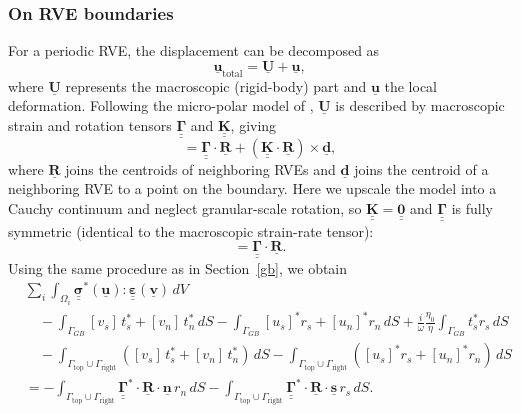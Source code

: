 \documentclass[12pt]{article}
\newcommand{\tensor}[1]{\underline{\underline{\boldsymbol{#1}}}}
\newcommand{\vect}[1]{\underline{\boldsymbol{#1}}}
\begin{document}
\subsubsection{On RVE boundaries}
For a periodic RVE, the displacement can be decomposed as
\begin{equation}
    \vect{u}_{\text{total}} = \vect{U} + \vect{u},
\end{equation}
where $\vect{U}$ represents the macroscopic (rigid-body) part and $\vect{u}$ the local deformation.  
Following the micro-polar model of \citet{rudge_micropolar_2021, rudge_viscoelastic_2025}, $\vect{U}$ is described by macroscopic strain and rotation tensors $\tensor{\Gamma}$ and $\tensor{K}$, giving
\begin{equation}
    [\vect{U}] = \tensor{\Gamma}\cdot\vect{R} + (\tensor{K}\cdot\vect{R})\times\vect{d},
\end{equation}
where $\vect{R}$ joins the centroids of neighboring RVEs and $\vect{d}$ joins the centroid of a neighboring RVE to a point on the boundary.  
Here we upscale the model into a Cauchy continuum and neglect granular-scale rotation, so $\tensor{K} = \tensor{0}$ and $\tensor{\Gamma}$ is fully symmetric (identical to the macroscopic strain-rate tensor):
\begin{equation}
    [\vect{U}] = \tensor{\Gamma}\cdot\vect{R}.
\end{equation}
Using the same procedure as in Section~\ref{gb}, we obtain
\begin{equation}
\begin{aligned}
&\sum_i \int_{\Omega_i} \tensor{\sigma}^*(\vect{u}) : \tensor{\varepsilon}(\vect{v})\, dV \\
&\quad - \int_{\Gamma_{GB}} [v_s]\, t_s^*+[v_n]\, t_n^*\, dS 
-\int_{\Gamma_{GB}} [u_s]^* r_s+[u_n]^* r_n\, dS 
+ \frac{i}{\omega}\frac{\eta_0}{\eta}\int_{\Gamma_{GB}} t_s^* r_s\, dS \\
&\quad - \int_{\Gamma_\text{top}\cup\Gamma_\text{right}} ([v_s]\, t_s^* + [v_n]\, t_n^*)\, dS
- \int_{\Gamma_\text{top}\cup\Gamma_\text{right}} ([u_s]^* r_s + [u_n]^* r_n)\, dS \\
&= -\int_{\Gamma_\text{top}\cup\Gamma_\text{right}} \tensor{\Gamma}^*\cdot\vect{R}\cdot\vect{n}\, r_n\, dS
   -\int_{\Gamma_\text{top}\cup\Gamma_\text{right}} \tensor{\Gamma}^*\cdot\vect{R}\cdot\vect{s}\, r_s\, dS.
\end{aligned}
\end{equation}
\end{document}
